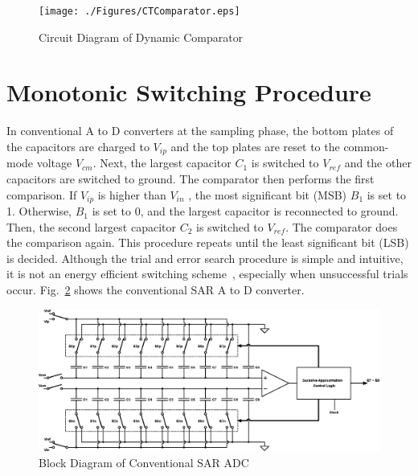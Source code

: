 \begin{figure}[ht]
	\begin{center}
		\texttt{[image: ./Figures/CTComparator.eps]}
		\caption{Circuit Diagram of Dynamic Comparator}
		\label{fig:CTC}
	\end{center}
\end{figure}


\section{Monotonic Switching Procedure}

\par
\hspace{1.2cm} In conventional A to D converters at the sampling phase, the bottom plates of the capacitors are charged to $V_{ip}$ and the top plates are reset to the common-mode voltage $V_{cm}$. Next, the largest capacitor $C_{1}$ is switched to $V_{ref}$ and  the other capacitors are switched to ground. The comparator then performs the first comparison. If $V_{ip}$ is higher than $V_{in}$ , the most significant bit (MSB) $B_{1}$ is set to 1. Otherwise, $B_{1}$ is set to 0, and the largest capacitor is reconnected to ground. Then, the second largest capacitor $C_{2}$ is switched to $V_{ref}$. The comparator does the comparison again. This procedure repeats until the least significant bit (LSB) is decided. Although the trial and error search procedure is simple and intuitive, it is not an energy efficient switching scheme~\cite{5437496}, especially when unsuccessful trials occur. Fig.~\ref{fig:CADC} shows the conventional SAR A to D converter.

\begin{figure}[ht]
	\begin{center}
		\includegraphics[scale=0.68]{./Figures/ConventionalDAC.eps}
		\caption{Block Diagram of Conventional SAR ADC}
		\label{fig:CADC}
	\end{center}
\end{figure}

